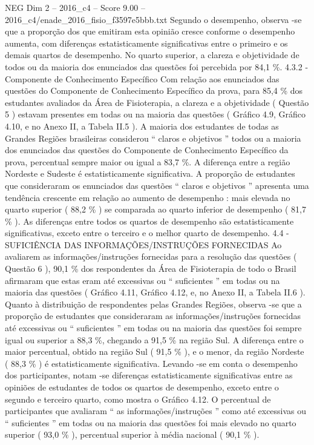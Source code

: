\begin{textsample}{NEG Dim 2 – 2016\_c4 – Score 9.00 – 2016\_c4/enade\_2016\_fisio\_f3597e5bbb.txt}
Segundo o desempenho, observa -se que a proporção dos que emitiram esta opinião cresce conforme o desempenho aumenta, com diferenças estatisticamente significativas entre o primeiro e os demais quartos de desempenho.
No quarto superior, a clareza e objetividade de todos ou da maioria dos enunciados das questões foi percebida por 84,1 \%. 4.3.2 - Componente de Conhecimento Específico Com relação aos enunciados das questões do Componente de Conhecimento Específico da prova, para 85,4 \% dos estudantes avaliados da Área de Fisioterapia, a clareza e a objetividade ( Questão 5 ) estavam presentes em todas ou na maioria das questões ( Gráfico 4.9, Gráfico 4.10, e no Anexo II, a Tabela II.5 ).
A maioria dos estudantes de todas as Grandes Regiões brasileiras considerou “ claros e objetivos ” todos ou a maioria dos enunciados das questões do Componente de Conhecimento Específico da prova, percentual sempre maior ou igual a 83,7 \%.
A diferença entre a região Nordeste e Sudeste é estatisticamente significativa.
A proporção de estudantes que consideraram os enunciados das questões “ claros e objetivos ” apresenta uma tendência crescente em relação ao aumento de desempenho : mais elevada no quarto superior ( 88,2 \% ) se comparada ao quarto inferior de desempenho ( 81,7 \% ).
As diferenças entre todos os quartos de desempenho são estatisticamente significativas, exceto entre o terceiro e o melhor quarto de desempenho. 4.4 - SUFICIÊNCIA DAS INFORMAÇÕES/INSTRUÇÕES FORNECIDAS Ao avaliarem as informações/instruções fornecidas para a resolução das questões ( Questão 6 ), 90,1 \% dos respondentes da Área de Fisioterapia de todo o Brasil afirmaram que estas eram até excessivas ou “ suficientes ” em todas ou na maioria das questões ( Gráfico 4.11, Gráfico 4.12, e, no Anexo II, a Tabela II.6 ).
Quanto à distribuição de respondentes pelas Grandes Regiões, observa -se que a proporção de estudantes que consideraram as informações/instruções fornecidas até excessivas ou “ suficientes ” em todas ou na maioria das questões foi sempre igual ou superior a 88,3 \%, chegando a 91,5 \% na região Sul.
A diferença entre o maior percentual, obtido na região Sul ( 91,5 \% ), e o menor, da região Nordeste ( 88,3 \% ) é estatisticamente significativa.
Levando -se em conta o desempenho dos participantes, notam -se diferenças estatisticamente significativas entre as opiniões de estudantes de todos os quartos de desempenho, exceto entre o segundo e terceiro quarto, como mostra o Gráfico 4.12.
O percentual de participantes que avaliaram “ as informações/instruções ” como até excessivas ou “ suficientes ” em todas ou na maioria das questões foi mais elevado no quarto superior ( 93,0 \% ), percentual superior à média nacional ( 90,1 \% ).

\end{textsample}
